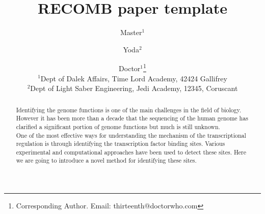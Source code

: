 \documentclass[11pt,letterpaper]{article}
\begin{document}
\thispagestyle{empty}

\title{RECOMB paper template}
\author
{
\centering
Master$^{1}$ \and Yoda$^{2}$ \and Doctor$^{1}$\footnote{Corresponding Author. Email: thirteenth@doctorwho.com} 
\\
		$^{1}$Dept of Dalek Affairs, Time Lord Academy, 42424 Gallifrey\\
	   	$^{2}$Dept of Light Saber Engineering, Jedi Academy, 12345, Coruscant\\	
}

\date{}

\maketitle
\begin{abstract}
Identifying the genome functions is one of the main challenges in the field of biology. However it has been more than a decade that the sequencing of the human genome has clarified a significant portion of genome functions but much is still unknown.\\
One of the most effective ways for understanding the mechanism of the transcriptional regulation is through identifying the transcription factor binding sites. Various experimental and computational approaches have been used to detect these sites. Here we are going to introduce a novel method for identifying these sites.
\end{abstract}
\end{document}
